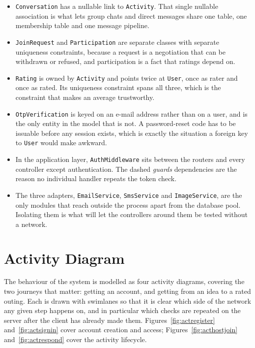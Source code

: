 \documentclass{tietreport}
\begin{document}
\begin{itemize}
  \item \texttt{Conversation} has a nullable link to \texttt{Activity}. That single
        nullable association is what lets group chats and direct messages share one
        table, one membership table and one message pipeline.

  \item \texttt{JoinRequest} and \texttt{Participation} are separate classes with
        separate uniqueness constraints, because a request is a negotiation that can be
        withdrawn or refused, and participation is a fact that ratings depend on.

  \item \texttt{Rating} is owned by \texttt{Activity} and points twice at \texttt{User},
        once as rater and once as rated. Its uniqueness constraint spans all three, which
        is the constraint that makes an average trustworthy.

  \item \texttt{OtpVerification} is keyed on an e-mail address rather than on a user, and
        is the only entity in the model that is not. A password-reset code has to be
        issuable before any session exists, which is exactly the situation a foreign key
        to \texttt{User} would make awkward.

  \item In the application layer, \texttt{AuthMiddleware} sits between the routers and
        every controller except authentication. The dashed \emph{guards} dependencies are
        the reason no individual handler repeats the token check.

  \item The three adapters, \texttt{EmailService}, \texttt{SmsService} and
        \texttt{ImageService}, are the only modules that reach outside the process apart
        from the database pool. Isolating them is what will let the controllers around
        them be tested without a network.
\end{itemize}

\section{Activity Diagram}

The behaviour of the system is modelled as four activity diagrams, covering the two
journeys that matter: getting an account, and getting from an idea to a rated outing.
Each is drawn with swimlanes so that it is clear which side of the network any given
step happens on, and in particular which checks are repeated on the server after the
client has already made them. Figures~\ref{fig:actregister} and~\ref{fig:actsignin}
cover account creation and access; Figures~\ref{fig:acthostjoin}
and~\ref{fig:actrespond} cover the activity lifecycle.
\end{document}
